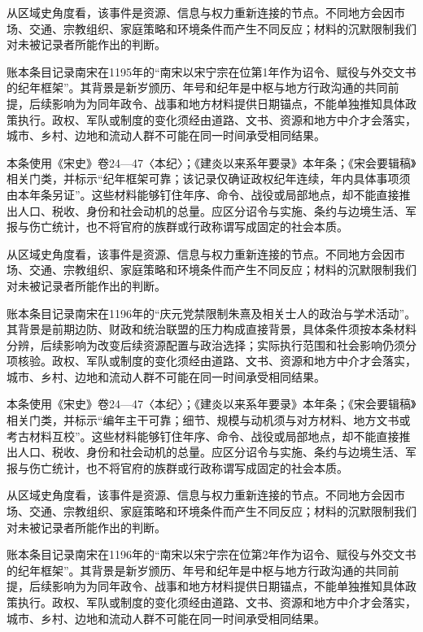 从区域史角度看，该事件是资源、信息与权力重新连接的节点。不同地方会因市场、交通、宗教组织、家庭策略和环境条件而产生不同反应；材料的沉默限制我们对未被记录者所能作出的判断。

账本条目记录南宋在1195年的“南宋以宋宁宗在位第1年作为诏令、赋役与外交文书的纪年框架”。其背景是新岁颁历、年号和纪年是中枢与地方行政沟通的共同前提，后续影响为为同年政令、战事和地方材料提供日期锚点，不能单独推知具体政策执行。政权、军队或制度的变化须经由道路、文书、资源和地方中介才会落实，城市、乡村、边地和流动人群不可能在同一时间承受相同结果。

本条使用《宋史》卷24—47〈本纪〉；《建炎以来系年要录》本年条；《宋会要辑稿》相关门类，并标示“纪年框架可靠；该记录仅确证政权纪年连续，年内具体事项须由本年条另证”。这些材料能够钉住年序、命令、战役或局部地点，却不能直接推出人口、税收、身份和社会动机的总量。应区分诏令与实施、条约与边境生活、军报与伤亡统计，也不将官府的族群或行政称谓写成固定的社会本质。

从区域史角度看，该事件是资源、信息与权力重新连接的节点。不同地方会因市场、交通、宗教组织、家庭策略和环境条件而产生不同反应；材料的沉默限制我们对未被记录者所能作出的判断。

账本条目记录南宋在1196年的“庆元党禁限制朱熹及相关士人的政治与学术活动”。其背景是前期边防、财政和统治联盟的压力构成直接背景，具体条件须按本条材料分辨，后续影响为改变后续资源配置与政治选择；实际执行范围和社会影响仍须分项核验。政权、军队或制度的变化须经由道路、文书、资源和地方中介才会落实，城市、乡村、边地和流动人群不可能在同一时间承受相同结果。

本条使用《宋史》卷24—47〈本纪〉；《建炎以来系年要录》本年条；《宋会要辑稿》相关门类，并标示“编年主干可靠；细节、规模与动机须与对方材料、地方文书或考古材料互校”。这些材料能够钉住年序、命令、战役或局部地点，却不能直接推出人口、税收、身份和社会动机的总量。应区分诏令与实施、条约与边境生活、军报与伤亡统计，也不将官府的族群或行政称谓写成固定的社会本质。

从区域史角度看，该事件是资源、信息与权力重新连接的节点。不同地方会因市场、交通、宗教组织、家庭策略和环境条件而产生不同反应；材料的沉默限制我们对未被记录者所能作出的判断。

账本条目记录南宋在1196年的“南宋以宋宁宗在位第2年作为诏令、赋役与外交文书的纪年框架”。其背景是新岁颁历、年号和纪年是中枢与地方行政沟通的共同前提，后续影响为为同年政令、战事和地方材料提供日期锚点，不能单独推知具体政策执行。政权、军队或制度的变化须经由道路、文书、资源和地方中介才会落实，城市、乡村、边地和流动人群不可能在同一时间承受相同结果。

